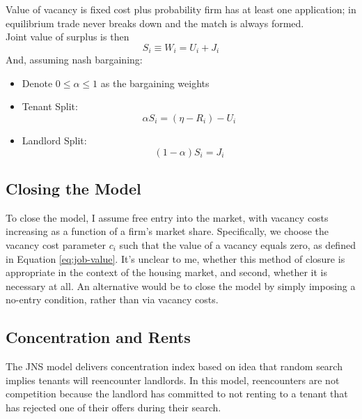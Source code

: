 Value of vacancy is fixed cost plus probability firm has at least one application; in equilibrium trade never breaks down and the match is always formed. \\

Joint value of surplus is then \begin{equation}\label{eq:surplus-value}
        S_i \equiv W_i = U_i + J_i
    \end{equation}
    And, assuming nash bargaining:
    \begin{itemize}
        \item Denote $0\leq \alpha \leq 1$ as the bargaining weights
        \item Tenant Split: \begin{equation}\label{eq:nash-tenant}
            \alpha S_i = (\eta - R_i) - U_i
        \end{equation}
        \item Landlord Split: \begin{equation}\label{eq:nash-landlord}
            (1-\alpha)S_i = J_i
        \end{equation}
    \end{itemize}

\subsection{Closing the Model}
   To close the model, I assume free entry into the market, with vacancy costs increasing as a function of a firm's market share. Specifically, we choose the vacancy cost parameter $c_i$ such that the value of a vacancy equals zero, as defined in Equation \ref{eq:job-value}. It's unclear to me, whether this method of closure is appropriate in the context of the housing market, and second, whether it is necessary at all. An alternative would be to close the model by simply imposing a no-entry condition, rather than via vacancy costs.

\subsection{Concentration and Rents}

 The JNS model delivers concentration index based on idea that random search implies tenants will reencounter landlords. In this model, reencounters are not competition because the landlord has committed to not renting to a tenant that has rejected one of their offers during their search. 

